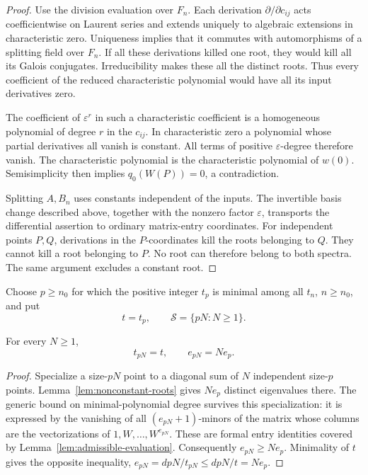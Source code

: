\begin{proof}
Use the division evaluation over $F_n$.  Each derivation
$\partial/\partial c_{ij}$ acts coefficientwise on Laurent series
and extends uniquely to algebraic extensions in characteristic zero.
Uniqueness implies that it commutes with automorphisms of a splitting
field over $F_n$.  If all these derivations killed one root, they
would kill all its Galois conjugates.  Irreducibility makes these all
the distinct roots.  Thus every coefficient of the reduced
characteristic polynomial would have all its input derivatives zero.

The coefficient of $\varepsilon^r$ in such a characteristic
coefficient is a homogeneous polynomial of degree $r$ in the
$c_{ij}$.  In characteristic zero a polynomial whose partial
derivatives all vanish is constant.  All terms of positive
$\varepsilon$-degree therefore vanish.  The characteristic polynomial
is the characteristic polynomial of $w(0)$.  Semisimplicity then
implies $q_0(W(P))=0$, a contradiction.

Splitting $A,B_n$ uses constants independent of the inputs.  The
invertible basis change described above, together with the nonzero
factor $\varepsilon$, transports the differential assertion to
ordinary matrix-entry coordinates.  For independent points $P,Q$,
derivations in the $P$-coordinates kill the roots belonging to $Q$.
They cannot kill a root belonging to $P$.  No root can therefore
belong to both spectra.  The same argument excludes a constant root.
\end{proof}

Choose $p\ge n_0$ for which the positive integer $t_p$ is minimal
among all $t_n$, $n\ge n_0$, and put
\[
 t=t_p,\qquad \mathcal S=\{pN:N\ge1\}.
\]

\begin{lemma}\label{lem:stable-multiplicity}
For every $N\ge1$,
\[
 t_{pN}=t,\qquad e_{pN}=Ne_p.
\]
\end{lemma}

\begin{proof}
Specialize a size-$pN$ point to a diagonal sum of $N$ independent
size-$p$ points.  Lemma~\ref{lem:nonconstant-roots} gives $Ne_p$
distinct eigenvalues there.  The generic bound on minimal-polynomial
degree survives this specialization: it is expressed by the vanishing
of all $(e_{pN}+1)$-minors of the matrix whose columns are the
vectorizations of $1,W,\ldots,W^{e_{pN}}$.  These are formal entry
identities covered by Lemma~\ref{lem:admissible-evaluation}.
Consequently $e_{pN}\ge Ne_p$.  Minimality of $t$ gives the opposite
inequality,
$e_{pN}=dpN/t_{pN}\le dpN/t=Ne_p$.
\end{proof}

